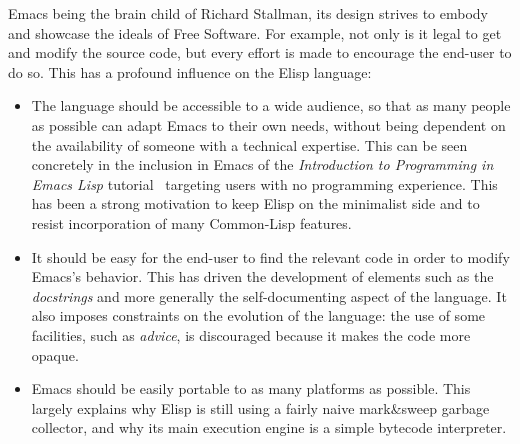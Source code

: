\documentclass[format=acmsmall, review=false, screen=true]{acmart}
\newcommand \Elisp {Elisp}
\begin{document}
Emacs being the brain child of Richard Stallman, its design strives to
embody and showcase the ideals of Free Software.  For example, not only
is it legal to get and modify the source code, but every effort
is made to encourage the end-user to do so.  This has a profound
influence on the \Elisp{} language:
\begin{itemize}
\item The language should be accessible to a wide audience, so that as many
  people as possible can adapt Emacs to their own needs, without being
  dependent on the availability of someone with a technical expertise.
  This can be seen concretely in the inclusion in Emacs of the
  \emph{Introduction to Programming in Emacs Lisp}
  tutorial~\citep{ElispIntro} targeting users with no programming
  experience.  This has been a strong motivation to keep \Elisp{} on the
  minimalist side and to resist incorporation of many Common-Lisp features.
\item It should be easy for the end-user to find the relevant code in order
  to modify Emacs's behavior.  This has driven the development of elements
  such as the \emph{docstrings} and more generally the self-documenting
  aspect of the language.  It also imposes constraints on the evolution of
  the language: the use of some facilities, such as \emph{advice}, is
  discouraged because it makes the code more opaque.
\item Emacs should be easily portable to as many platforms as possible.
  This largely explains why \Elisp{} is still using a fairly naive
  mark\&sweep garbage collector, and why its main execution engine is
  a simple bytecode interpreter.
\end{itemize}



\end{document}
